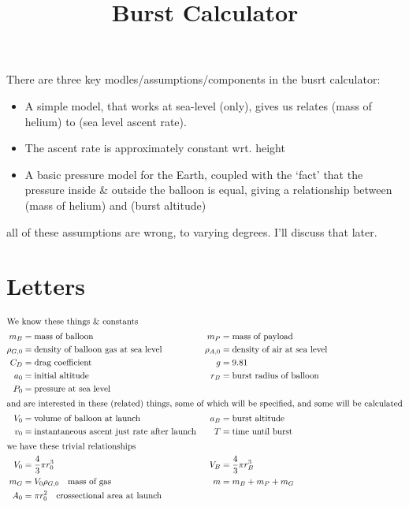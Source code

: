 \documentclass{article}
\begin{document}
\title{Burst Calculator}

There are three key modles/assumptions/components in the busrt calculator:

\begin{itemize}
    \item A simple model, that works at sea-level (only), gives us
          relates (mass of helium) to (sea level ascent rate).
    \item The ascent rate is approximately constant wrt. height
    \item A basic pressure model for the Earth, coupled with the `fact'
          that the pressure inside \& outside the balloon is equal, giving
          a relationship between (mass of helium) and (burst altitude)
\end{itemize}

all of these assumptions are wrong, to varying degrees.
I'll discuss that later.

\setcounter{section}{-1}
\section{Letters}

\begin{align*}
\intertext{We know these things \& constants}
    m_B &= \text{mass of balloon} &
    m_P &= \text{mass of payload} \\
    \rho_{G,0} &= \text{density of balloon gas at sea level} &
    \rho_{A,0} &= \text{density of air at sea level } \\
    C_D &= \text{drag coefficient} &
    g &= 9.81 \\
    a_0 &= \text{initial altitude} &
    r_B &= \text{burst radius of balloon} \\
    P_0 &= \text{pressure at sea level} \\

\intertext{and are interested in these (related) things, some of which
           will be specified, and some will be calculated}
    V_0 &= \text{volume of balloon at launch} &
    a_B &= \text{burst altitude} \\
    v_0 &= \text{instantaneous ascent just rate after launch} &
    T &= \text{time until burst} \\

\intertext{we have these trivial relationships}
    V_0 &= \frac{4}{3} \pi r_0^3 &
    V_B &= \frac{4}{3} \pi r_B^3 \\
    m_G &= V_0 \rho_{G,0} \quad \text{mass of gas} &
    m &= m_B + m_P + m_G \\
    A_0 &= \pi r_0^2 \quad \text{crossectional area at launch} \\

\end{align*}
\end{document}
